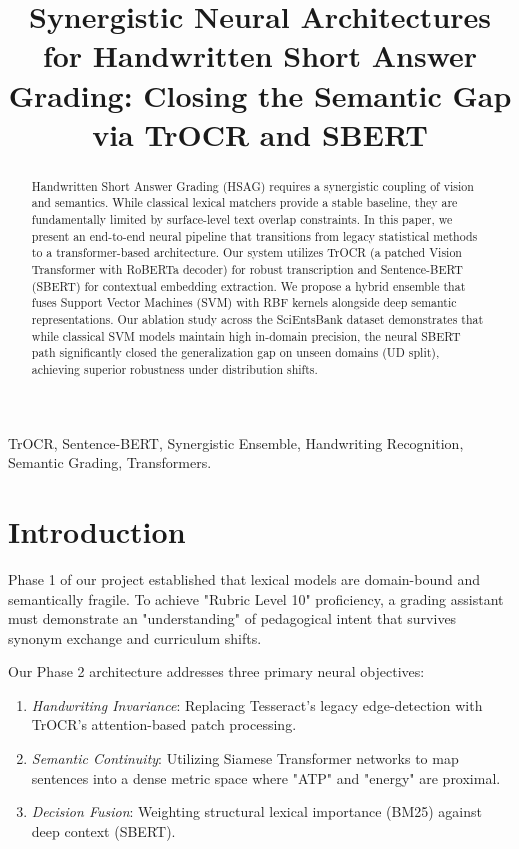 \documentclass[conference]{IEEEtran}
\begin{document}
\title{Synergistic Neural Architectures for Handwritten Short Answer Grading: Closing the Semantic Gap via TrOCR and SBERT}

\author{
}

\maketitle

\begin{abstract}
Handwritten Short Answer Grading (HSAG) requires a synergistic coupling of vision and semantics. While classical lexical matchers provide a stable baseline, they are fundamentally limited by surface-level text overlap constraints. In this paper, we present an end-to-end neural pipeline that transitions from legacy statistical methods to a transformer-based architecture. Our system utilizes TrOCR (a patched Vision Transformer with RoBERTa decoder) for robust transcription and Sentence-BERT (SBERT) for contextual embedding extraction. We propose a hybrid ensemble that fuses Support Vector Machines (SVM) with RBF kernels alongside deep semantic representations. Our ablation study across the SciEntsBank dataset demonstrates that while classical SVM models maintain high in-domain precision, the neural SBERT path significantly closed the generalization gap on unseen domains (UD split), achieving superior robustness under distribution shifts.
\end{abstract}

\begin{IEEEkeywords}
TrOCR, Sentence-BERT, Synergistic Ensemble, Handwriting Recognition, Semantic Grading, Transformers.
\end{IEEEkeywords}

\section{Introduction}
Phase 1 of our project established that lexical models are domain-bound and semantically fragile. To achieve "Rubric Level 10" proficiency, a grading assistant must demonstrate an "understanding" of pedagogical intent that survives synonym exchange and curriculum shifts.

Our Phase 2 architecture addresses three primary neural objectives:
\begin{enumerate}
    \item \textit{Handwriting Invariance}: Replacing Tesseract's legacy edge-detection with TrOCR's attention-based patch processing.
    \item \textit{Semantic Continuity}: Utilizing Siamese Transformer networks to map sentences into a dense metric space where "ATP" and "energy" are proximal.
    \item \textit{Decision Fusion}: Weighting structural lexical importance (BM25) against deep context (SBERT).
\end{enumerate}
\end{document}
